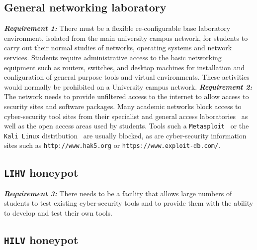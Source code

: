 \subsection{General networking laboratory}\label{subsec:GeneralLab}

\noindent \emph{\textbf{Requirement 1:}} There must be a flexible
re-configurable base laboratory environment, isolated from the main university
campus network, for students to carry out their normal studies of networks,
operating systems and network services. Students require administrative access
to the basic networking equipment such as routers, switches, and desktop
machines for installation and configuration of general purpose tools and
virtual environments. These activities would normally be prohibited on a
University campus network.  \newline\newline \noindent
\emph{\textbf{Requirement 2:}} The network needs to provide unfiltered access
to the internet to allow access to security sites and software packages. Many
academic networks block access to cyber-security tool sites from their
specialist and general access laboratories~\cite{ACGO:06,YYLCHJ:04} as well as
the open access areas used by students. Tools such a
\texttt{Metasploit}~\cite{R7:17} or the \texttt{Kali Linux}
distribution~\cite{OS:17} are usually blocked, as are cyber-security
information sites such as \texttt{http://www.hak5.org} or
\texttt{https://www.exploit-db.com/}.

\subsection{\texttt{LIHV} honeypot}\label{subsec:LabHoneypot}

\noindent \emph{\textbf{Requirement 3:}} There needs to be a facility that
allows large numbers of students to test existing cyber-security tools and to
provide them with the ability to develop and test their own tools.

\subsection{\texttt{HILV} honeypot}\label{subsec:ResearchHoneypot}

